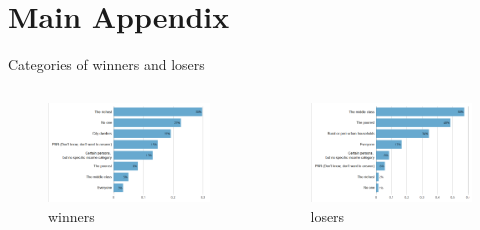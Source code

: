 \documentclass[aspectratio=169,9pt,dvipsnames]{beamer}
\begin{document}
\appendix
\section{Main Appendix}

    \begin{frame}{Categories of winners and losers} \label{win_lose_categories}
    \begin{adjustwidth}{-3.5em}{-2.5em}

\begin{columns}[onlytextwidth]
\begin{column}{.5\textwidth}
\begin{figure}
  \includegraphics[width=\textwidth]{Images/tax_winners.png}
  \caption{winners}
\end{figure}
\end{column}
\hfill
\begin{column}{.5\textwidth}
\begin{figure}
  \includegraphics[width=\textwidth]{Images/tax_losers.png}
  \caption{losers}
\end{figure}
\end{column}
\end{columns}

\end{adjustwidth}
\hyperlink{main_reform}{}
    \end{frame}
\end{document}

